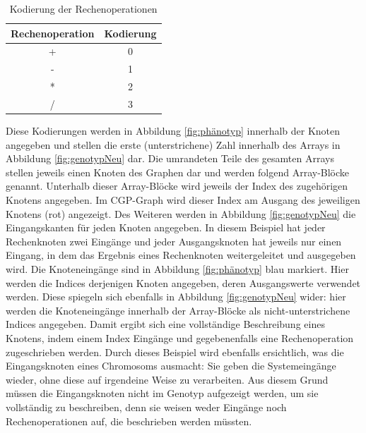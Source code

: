 \begin{table}[H]
    \centering
    \begin{tabular}{c | c}
       \textbf{Rechenoperation} & \textbf{Kodierung} \\ \hline
        + & 0 \\ \hline
        - & 1 \\ \hline
        * & 2 \\ \hline
        / & 3
    \end{tabular}
    \caption{Kodierung der Rechenoperationen}
    \label{table:kodierung}
\end{table}

Diese Kodierungen werden in Abbildung \ref{fig:phänotyp} innerhalb der Knoten angegeben und stellen die erste (unterstrichene) Zahl innerhalb des Arrays in Abbildung \ref{fig:genotypNeu} dar.
Die umrandeten Teile des gesamten Arrays stellen jeweils einen Knoten des Graphen dar und werden folgend Array-Blöcke genannt.
Unterhalb dieser Array-Blöcke wird jeweils der Index des zugehörigen Knotens angegeben.
Im CGP-Graph wird dieser Index am Ausgang des jeweiligen Knotens (rot) angezeigt.\newline
Des Weiteren werden in Abbildung \ref{fig:genotypNeu} die Eingangskanten für jeden Knoten angegeben. 
In diesem Beispiel hat jeder Rechenknoten zwei Eingänge und jeder Ausgangsknoten hat jeweils nur einen Eingang, in dem das Ergebnis eines Rechenknoten weitergeleitet und ausgegeben wird.
Die Knoteneingänge sind in Abbildung \ref{fig:phänotyp} blau markiert.
Hier werden die Indices derjenigen Knoten angegeben, deren Ausgangswerte verwendet werden.
Diese spiegeln sich ebenfalls in Abbildung \ref{fig:genotypNeu} wider: hier werden die Knoteneingänge innerhalb der Array-Blöcke als nicht-unterstrichene Indices angegeben.
Damit ergibt sich eine vollständige Beschreibung eines Knotens, indem einem Index Eingänge und gegebenenfalls eine Rechenoperation zugeschrieben werden.\newline
Durch dieses Beispiel wird ebenfalls ersichtlich, was die Eingangsknoten eines Chromosoms ausmacht:
Sie geben die Systemeingänge wieder, ohne diese auf irgendeine Weise zu verarbeiten.
Aus diesem Grund müssen die Eingangsknoten nicht im Genotyp aufgezeigt werden, um sie vollständig zu beschreiben, denn sie weisen weder Eingänge noch Rechenoperationen auf, die beschrieben werden müssten.

